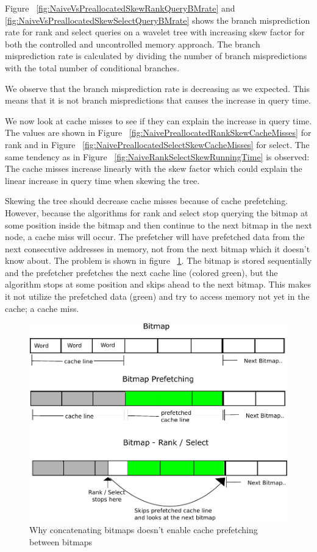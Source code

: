 Figure ~\ref{fig:NaiveVsPreallocatedSkewRankQueryBMrate} and \ref{fig:NaiveVsPreallocatedSkewSelectQueryBMrate} shows the branch misprediction rate for rank and select queries on a wavelet tree with increasing skew factor for both the controlled and uncontrolled memory approach. 
The branch misprediction rate is calculated by dividing the number of branch mispredictions with the total number of conditional branches.

We observe that the branch misprediction rate is decreasing as we expected. 
This means that it is not branch mispredictions that causes the increase in query time. 

We now look at cache misses to see if they can explain the increase in query time. 
The values are shown in Figure ~\ref{fig:NaivePreallocatedRankSkewCacheMisses} for rank and in Figure ~\ref{fig:NaivePreallocatedSelectSkewCacheMisses} for select.
The same tendency as in Figure ~\ref{fig:NaiveRankSelectSkewRunningTime} is observed: 
The cache misses increase linearly with the skew factor which could explain the linear increase in query time when skewing the tree.

Skewing the tree should decrease cache misses because of cache prefetching. However, because the algorithms for rank and select stop querying the bitmap at some position inside the bitmap and then continue to the next bitmap in the next node, a cache miss will occur. The prefetcher will have prefetched data from the next consecutive addresses in memory, not from the next bitmap which it doesn't know about.
The problem is shown in figure ~\ref{fig:QueryPrefetchFigure}. The bitmap is stored sequentially and the prefetcher prefetches the next cache line (colored green), but the algorithm stops at some position and skips ahead to the next bitmap. This makes it not utilize the prefetched data (green) and try to access memory not yet in the cache; a cache miss.

\begin{figure}
\caption{Why concatenating bitmaps doesn't enable cache prefetching between bitmaps}
\label{fig:QueryPrefetchFigure}
\includegraphics[width=\textwidth]{QueryPrefetchFigure.pdf}
\end{figure}

